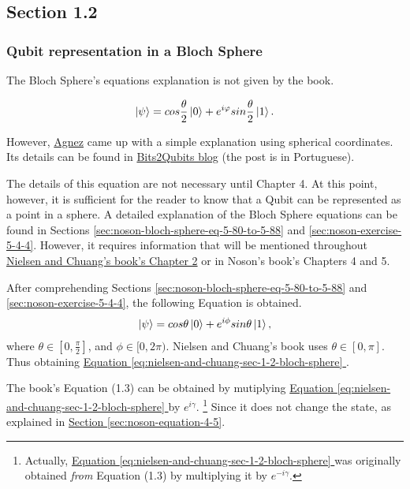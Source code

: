 \subsection{Section 1.2}
\subsubsection{Qubit representation in a Bloch Sphere}

The Bloch Sphere's equations explanation is not given by the book.

\begin{align}
\ket{\psi} = 
    cos \frac{\theta}{2}\ket{0} + e^{i \varphi} sin \frac{\theta}{2} \ket{1} .
    \label{eq:nielsen-and-chuang-sec-1-2-bloch-sphere}
\end{align}

However, \href{https://github.com/victoragnez}{Agnez} came up with a simple explanation using spherical coordinates.
Its details can be found in
\href{https://bits2qubits.blogspot.com/2018/09/representacao-de-qubits-na-esfera-de.html}{Bits2Qubits blog}
(the post is in Portuguese).

The details of this equation are not necessary until Chapter 4.
At this point, however, it is sufficient for the reader to know that
a Qubit can be represented as a point in a sphere.
A detailed explanation of the Bloch Sphere equations can be found in Sections
\hyperref[sec:noson-bloch-sphere-eq-5-80-to-5-88]{ \ref{sec:noson-bloch-sphere-eq-5-80-to-5-88}} and
\hyperref[sec:noson-exercise-5-4-4]{\ref{sec:noson-exercise-5-4-4}}.
However, it requires information that will be mentioned throughout
\hyperref[sec:nielsen-and-chuang-chapter-2]{Nielsen and Chuang's book's Chapter 2}
or in Noson's book's Chapters 4 and 5.

After comprehending Sections
\hyperref[sec:noson-bloch-sphere-eq-5-80-to-5-88]{ \ref{sec:noson-bloch-sphere-eq-5-80-to-5-88}} and
\hyperref[sec:noson-exercise-5-4-4]{\ref{sec:noson-exercise-5-4-4}},
the following Equation is obtained.
\begin{align}
    \ket\psi = cos\theta \ket0 + e^{i\phi} sin\theta \ket1,
\end{align}
where $\theta \in [0, \frac \pi 2]$, and $\phi \in [0, 2\pi)$.
Nielsen and Chuang's book uses $\theta \in [0, \pi]$.
Thus obtaining \hyperref[eq:nielsen-and-chuang-sec-1-2-bloch-sphere]{
    Equation \ref{eq:nielsen-and-chuang-sec-1-2-bloch-sphere}
}.

The book's Equation (1.3) can be obtained by mutiplying \hyperref[eq:nielsen-and-chuang-sec-1-2-bloch-sphere]{
    Equation \ref{eq:nielsen-and-chuang-sec-1-2-bloch-sphere}
} by $e^{i\gamma}$.
    \footnote{Actually, \hyperref[eq:nielsen-and-chuang-sec-1-2-bloch-sphere]{
        Equation \ref{eq:nielsen-and-chuang-sec-1-2-bloch-sphere}
        }
    was originally obtained \emph{from} Equation (1.3) by multiplying it by $e^{-i\gamma}$.
    }
Since it does not change the state,
as explained in \hyperref[sec:noson-equation-4-5]{Section \ref{sec:noson-equation-4-5}}.

